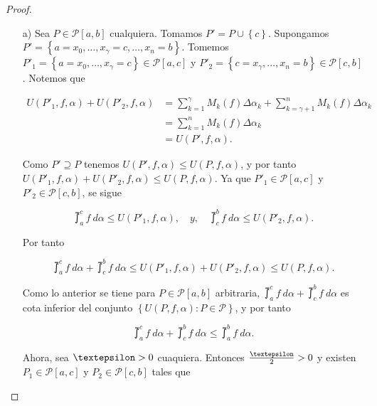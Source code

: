 \begin{proof}

\begin{itemize}
  \item[a)]Sea $P\in\mathcal{P}\left[a,b\right]$ cualquiera. Tomamos $P'=P\cup\left\lbrace c\right\rbrace$. Supongamos $P'=\left\lbrace a=x_0,\dots,x_\gamma=c,\dots,x_n=b\right\rbrace$. Tomemos $P'_1=\left\lbrace a=x_0,\dots,x_\gamma=c\right\rbrace\in\mathcal{P}\left[a,c\right]$ y $P'_2=\left\lbrace c=x_\gamma,\dots,x_n=b\right\rbrace\in\mathcal{P}\left[c,b\right]$. Notemos que

  \begin{align*}
  U\left(P'_1,f,\alpha\right)+U\left(P'_2,f,\alpha\right)&=\sum_{k=1}^{\gamma}M_k\left(f\right)\Delta\alpha_k+\sum_{k=\gamma+1}^{n}M_k\left(f\right)\Delta\alpha_k\\
  &=\sum_{k=1}^{n}M_k\left(f\right)\Delta\alpha_k\\
  &=U\left(P',f,\alpha\right).
  \end{align*}

Como $P'\supseteq P$ tenemos $U\left(P',f,\alpha\right)\leq U\left(P,f,\alpha\right)$, y por tanto $U\left(P'_1,f,\alpha\right)+U\left(P'_2,f,\alpha\right)\leq U\left(P,f,\alpha\right)$. Ya que $P'_1\in\mathcal{P}\left[a,c\right]$ y $P'_2\in\mathcal{P}\left[c,b\right]$, se sigue

\begin{equation*}
  \upint_a^c f\ d\alpha \leq U\left(P'_1,f,\alpha\right),\quad y,\quad \upint_c^b f\ d\alpha \leq U\left(P'_2,f,\alpha\right).
\end{equation*}

Por tanto

\begin{equation*}
  \upint_a^c f\ d\alpha + \upint_c^b f\ d\alpha \leq U\left(P'_1,f,\alpha\right)+U\left(P'_2,f,\alpha\right)\leq U\left(P,f,\alpha\right).
\end{equation*}

Como lo anterior se tiene para $P\in\mathcal{P}\left[a,b\right]$ arbitraria, $\upint_a^c f\ d\alpha + \upint_c^b f\ d\alpha$ es cota inferior del conjunto $\left\lbrace U\left(P,f,\alpha\right):P\in\mathcal{P}\right\rbrace$, y por tanto

\setcounter{equation}{0}
\begin{equation}
  \upint_a^c f\ d\alpha + \upint_c^b f\ d\alpha \leq \upint_a^b f\ d\alpha.
\end{equation}

Ahora, sea $\text{\textepsilon}>0$ cuaquiera. Entonces $\frac{\text{\textepsilon}}{2}>0$ y existen $P_1\in\mathcal{P}\left[a,c\right]$ y $P_2\in\mathcal{P}\left[c,b\right]$ tales que


\end{itemize}
\end{proof}
